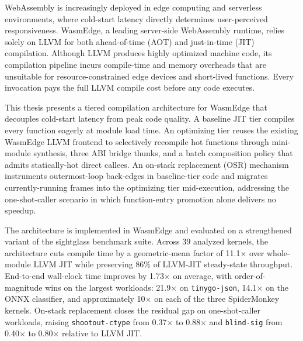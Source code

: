 \begin{abstract*}

WebAssembly is increasingly deployed in edge computing and serverless environments, where cold-start latency directly determines user-perceived responsiveness. WasmEdge, a leading server-side WebAssembly runtime, relies solely on LLVM for both ahead-of-time (AOT) and just-in-time (JIT) compilation. Although LLVM produces highly optimized machine code, its compilation pipeline incurs compile-time and memory overheads that are unsuitable for resource-constrained edge devices and short-lived functions. Every invocation pays the full LLVM compile cost before any code executes.

This thesis presents a tiered compilation architecture for WasmEdge that decouples cold-start latency from peak code quality. A baseline JIT tier compiles every function eagerly at module load time. An optimizing tier reuses the existing WasmEdge LLVM frontend to selectively recompile hot functions through mini-module synthesis, three ABI bridge thunks, and a batch composition policy that admits statically-hot direct callees. An on-stack replacement (OSR) mechanism instruments outermost-loop back-edges in baseline-tier code and migrates currently-running frames into the optimizing tier mid-execution, addressing the one-shot-caller scenario in which function-entry promotion alone delivers no speedup.

The architecture is implemented in WasmEdge and evaluated on a strengthened variant of the sightglass benchmark suite. Across 39 analyzed kernels, the architecture cuts compile time by a geometric-mean factor of 11.1$\times$ over whole-module LLVM JIT while preserving 86\% of LLVM-JIT steady-state throughput. End-to-end wall-clock time improves by 1.73$\times$ on average, with order-of-magnitude wins on the largest workloads: 21.9$\times$ on \texttt{tinygo-json}, 14.1$\times$ on the ONNX classifier, and approximately 10$\times$ on each of the three SpiderMonkey kernels. On-stack replacement closes the residual gap on one-shot-caller workloads, raising \texttt{shootout-ctype} from 0.37$\times$ to 0.88$\times$ and \texttt{blind-sig} from 0.40$\times$ to 0.80$\times$ relative to LLVM JIT.

\end{abstract*}
